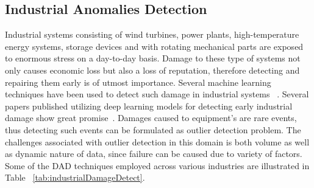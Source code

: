 \subsection{Industrial Anomalies Detection}

Industrial systems consisting of wind turbines, power plants, high-temperature energy systems, storage devices and  with rotating mechanical parts are exposed to enormous stress on a day-to-day basis. Damage to these type of systems not only causes economic loss but also a loss of reputation, therefore detecting and repairing them early is of utmost importance. Several machine learning techniques have been used to detect such damage in industrial systems ~\cite{ramotsoela2018survey,marti2015anomaly}. Several papers published utilizing deep learning models for detecting early industrial damage show great promise~\cite{atha2018evaluation,de2018automatic,wang2018residential}. Damages caused to equipment's are rare events, thus  detecting such events can be formulated as outlier detection problem. The challenges associated with outlier detection in this domain is both volume as well as dynamic nature of data, since failure can be caused due to variety of factors. Some of the DAD techniques employed across various industries are illustrated in Table ~\ref{tab:industrialDamageDetect}.




